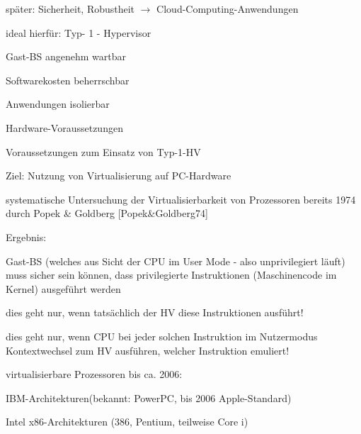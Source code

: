 \documentclass[a4paper]{article}
\newcommand{\cmark}{\ding{51}}
\newcommand{\xmark}{\ding{55}}
\begin{document}
\begin{multicols}{3}
\begin{itemize*}
\begin{itemize*}
            \item später: Sicherheit, Robustheit $\rightarrow$ Cloud-Computing-Anwendungen
        \end{itemize*}
        \item ideal hierfür: Typ- 1 - Hypervisor
        \begin{itemize*}
            \item[\cmark] Gast-BS angenehm wartbar
            \item[\cmark] Softwarekosten beherrschbar
            \item[\cmark] Anwendungen isolierbar
        \end{itemize*}
    \end{itemize*}

    Hardware-Voraussetzungen

    \begin{itemize*}
        \item Voraussetzungen zum Einsatz von Typ-1-HV
        \begin{itemize*}
            \item Ziel: Nutzung von Virtualisierung auf PC-Hardware
            \item systematische Untersuchung der Virtualisierbarkeit von Prozessoren bereits 1974 durch Popek \& Goldberg [Popek\&Goldberg74]
            \item Ergebnis: \begin{itemize*} \item Gast-BS (welches aus Sicht der CPU im User Mode - also unprivilegiert läuft) muss sicher sein können, dass privilegierte Instruktionen (Maschinencode im Kernel) ausgeführt werden \item dies geht nur, wenn tatsächlich der HV diese Instruktionen ausführt! \item dies geht nur, wenn CPU bei jeder solchen Instruktion im Nutzermodus Kontextwechsel zum HV ausführen, welcher Instruktion emuliert! \end{itemize*}
        \end{itemize*}
        \item virtualisierbare Prozessoren bis ca. 2006:
        \begin{itemize*}
            \item[\cmark] IBM-Architekturen(bekannt: PowerPC, bis 2006 Apple-Standard)
            \item[\xmark] Intel x86-Architekturen (386, Pentium, teilweise Core i)
        \end{itemize*}
    \end{itemize*}


\end{multicols}
\end{document}
